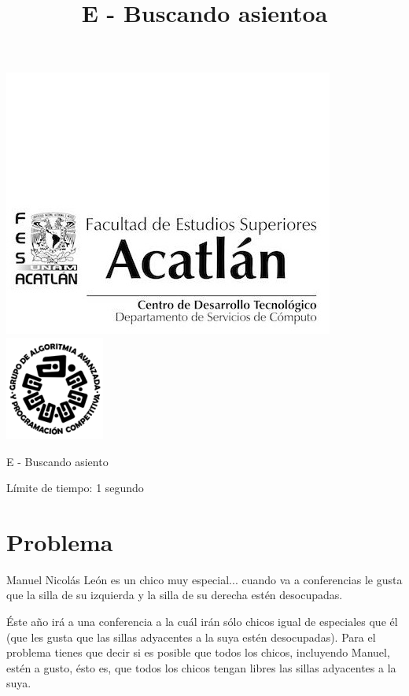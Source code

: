 \documentclass[letter,10pt]{article}
\date{}
\begin{document}
\title{E - Buscando asientoa}

\includegraphics[scale=0.6]{logo} \hspace*{9.00cm}
\includegraphics[scale=0.5]{dsc} 
\bigskip
\begin{center}
    \Large E - Buscando asiento
\end{center}

\begin{flushright}
Límite de tiempo: 1 segundo
\par\end{flushright}
\bigskip

\section*{Problema}

Manuel Nicolás León es un chico muy especial... cuando va a conferencias le gusta que la silla de su izquierda y la silla de su derecha estén desocupadas.

Éste año irá a una conferencia a la cuál irán sólo chicos igual de especiales que él (que les gusta que las sillas adyacentes a la suya estén desocupadas). Para el problema tienes que decir si es posible que todos los chicos, incluyendo Manuel, estén a gusto, ésto es, que todos los chicos tengan libres las sillas adyacentes a la suya.
\end{document}
